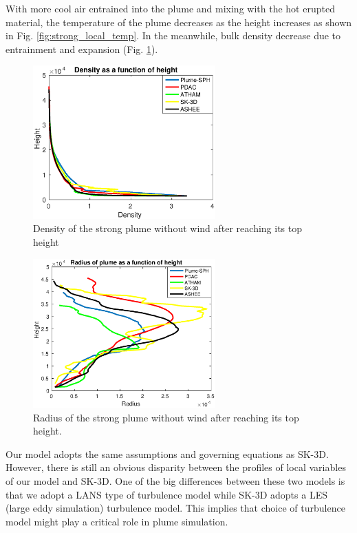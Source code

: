 \documentclass[gmd, manuscript]{copernicus}
\begin{document}
With more cool air entrained into the plume and mixing with the hot erupted material, the temperature of the plume decreases as the height increases as shown in Fig. \ref{fig:strong_local_temp}. In the meanwhile, bulk density decrease due to entrainment and expansion (Fig. \ref{fig:strong_local_density}).
\begin{figure}
\center
\includegraphics[width=7cm]{Fig13}
\caption{Density of the strong plume without wind after reaching its top height}
\label{fig:strong_local_density}
\end{figure}
\begin{figure}
\center
\includegraphics[width=7cm]{Fig14}
\caption{Radius of the strong plume without wind after reaching its top height.}
\label{fig:strong_local_radius}
\end{figure}
Our model adopts the same assumptions and governing equations as SK-3D. However, there is still an obvious disparity between the profiles of local variables of our model and SK-3D. One of the big differences between these two models is that we adopt a LANS type of turbulence model while SK-3D adopts a LES (large eddy simulation) turbulence model. This implies that choice of  turbulence model might play a critical role in plume simulation.
\end{document}
